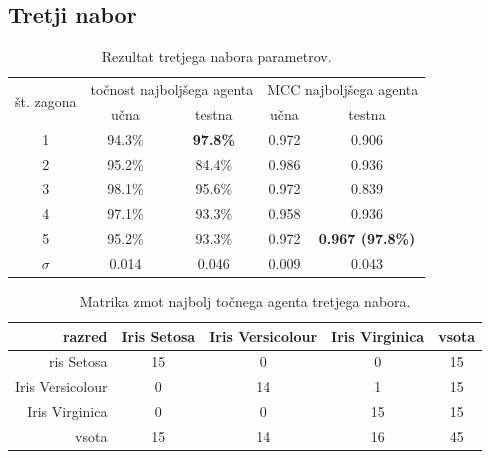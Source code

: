 \subsection{Tretji nabor}\label{subsec:dodatek-iris-tretji-nabor}
\begin{table}[H]
    \begin{center}
        \begin{tabular}{|| c | c c || c c ||}
            \hline
            \multirow{2}{*}{št. zagona} & \multicolumn{2}{c||}{točnost najboljšega agenta} & \multicolumn{2}{c||}{MCC najboljšega agenta} \\ \cline{2-5}
            & učna    & testna           & učna  & testna         \\
            \hline
            1        & 94.3\% & \textbf{97.8\%} & 0.972 & 0.906          \\
            \hline
            2        & 95.2\% & 84.4\%          & 0.986 & 0.936          \\
            \hline
            3        & 98.1\% & 95.6\%          & 0.972 & 0.839          \\
            \hline
            4        & 97.1\% & 93.3\%          & 0.958 & 0.936          \\
            \hline
            5        & 95.2\% & 93.3\%          & 0.972 & \textbf{0.967 (97.8\%)} \\
            \hline
            $\sigma$ & 0.014   & 0.046            & 0.009 & 0.043          \\
            \hline
        \end{tabular}
    \end{center}
    \caption{Rezultat tretjega nabora parametrov.}
    \label{tab:iris_result_3}
\end{table}

\begin{table}[H]
    \centering
    \begin{tabular}{||rcccc||}
        \hline
        razred           & Iris Setosa & Iris Versicolour & Iris Virginica & vsota \\ \hline
        ris Setosa       & 15          & 0                & 0              & 15    \\ \hline
        Iris Versicolour & 0           & 14               & 1              & 15    \\ \hline
        Iris Virginica   & 0           & 0                & 15             & 15    \\ \hline
        vsota            & 15          & 14               & 16             & 45    \\ \hline
    \end{tabular}
    \caption{Matrika zmot najbolj točnega agenta tretjega nabora.}
    \label{tab:iris_acc_3}
\end{table}

